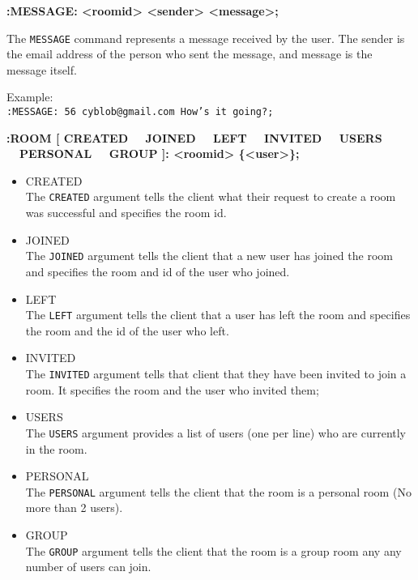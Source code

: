 {\bf :MESSAGE: <roomid> <sender> <message>;}

The \texttt{MESSAGE} command represents a message received by the user. The sender is the email address of the person who sent the message, and message is the message itself.

Example: \\
\texttt{:MESSAGE: 56 cyblob@gmail.com How’s it going?;}

{\bf :ROOM [ CREATED \ \vline \ JOINED \ \vline \ LEFT \ \vline \ INVITED \ \vline \ USERS \ \vline \ PERSONAL \ \vline \ GROUP ]: <roomid> \{<user>\};}

\begin{itemize}

\item{CREATED \\
The \texttt{CREATED} argument tells the client what their request to create a room was successful and specifies the room id.}

\item{JOINED \\
The \texttt{JOINED} argument tells the client that a new user has joined the room and specifies the room and id of the user who joined.}

\item{LEFT \\
The \texttt{LEFT} argument tells the client that a user has left the room and specifies the room and the id of the user who left.}

\item{INVITED \\
The \texttt{INVITED} argument tells that client that they have been invited to join a room. It specifies the room and the user who invited them;}

\item{USERS \\
The \texttt{USERS} argument provides a list of users (one per line) who are currently in the room.}

\item{PERSONAL \\
The \texttt{PERSONAL} argument tells the client that the room is a personal room (No more than 2 users).}

\item{GROUP \\
The \texttt{GROUP} argument tells the client that the room is a group room any any number of users can join.}
	
\end{itemize}

